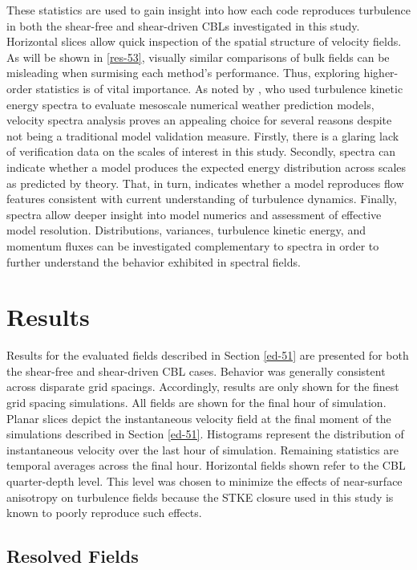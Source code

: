 These statistics are used to gain insight into how each code reproduces turbulence in both the shear-free and shear-driven CBLs investigated in this study. Horizontal slices allow quick inspection of the spatial structure of velocity fields. As will be shown in \autoref{res-53}, visually similar comparisons of bulk fields can be misleading when surmising each method's performance. Thus, exploring higher-order statistics is of vital importance. As noted by  \citet{Skamarock04}, who used turbulence kinetic energy spectra to evaluate mesoscale numerical weather prediction models, velocity spectra analysis proves an appealing choice for several reasons despite not being a traditional model validation measure. Firstly, there is a glaring lack of verification data on the scales of interest in this study. Secondly, spectra can indicate whether a model produces the expected energy distribution across scales as predicted by theory. That, in turn, indicates whether a model reproduces flow features consistent with current understanding of turbulence dynamics. Finally, spectra allow deeper insight into model numerics and assessment of effective model resolution. Distributions, variances, turbulence kinetic energy, and momentum fluxes can be investigated complementary to spectra in order to further understand the behavior exhibited in spectral fields.

\section{Results}
\label{res-53}

Results for the evaluated fields described in Section \autoref{ed-51} are presented for both the shear-free and shear-driven CBL cases. Behavior was generally consistent across disparate grid spacings. Accordingly, results are only shown for the finest grid spacing simulations. All fields are shown for the final hour of simulation. Planar slices depict the instantaneous velocity field at the final moment of the simulations described in Section \autoref{ed-51}. Histograms represent the distribution of instantaneous velocity over the last hour of simulation. Remaining statistics are temporal averages across the final hour. Horizontal fields shown refer to the CBL quarter-depth level. This level was chosen to minimize the effects of near-surface anisotropy on turbulence fields because the STKE closure used in this study is known to poorly reproduce such effects.

\subsection{Resolved Fields}
\label{resolve-531}

